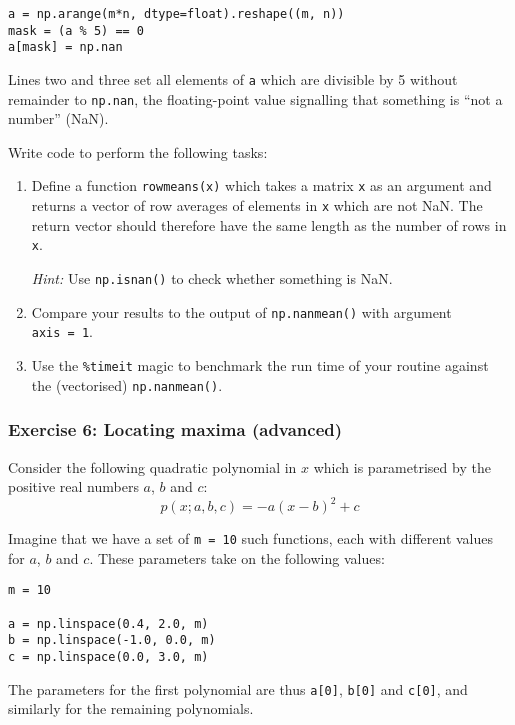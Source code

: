 \documentclass[10pt]{scrartcl}
\begin{document}
\begin{verbatim}
a = np.arange(m*n, dtype=float).reshape((m, n))
mask = (a % 5) == 0
a[mask] = np.nan
\end{verbatim}

Lines two and three set all elements of \texttt{a} which are divisible
by 5 without remainder to \texttt{np.nan}, the floating-point value
signalling that something is ``not a number'' (NaN).

Write code to perform the following tasks:

\begin{enumerate}
\def\labelenumi{\arabic{enumi}.}
\item
  Define a function \texttt{rowmeans(x)} which takes a matrix \texttt{x}
  as an argument and returns a vector of row averages of elements in
  \texttt{x} which are not NaN. The return vector should therefore have
  the same length as the number of rows in \texttt{x}.

  \emph{Hint:} Use \texttt{np.isnan()} to check whether something is
  NaN.
\item
  Compare your results to the output of \texttt{np.nanmean()} with
  argument \texttt{axis\ =\ 1}.
\item
  Use the \texttt{\%timeit} magic to benchmark the run time of your
  routine against the (vectorised) \texttt{np.nanmean()}.
\end{enumerate}

    \hypertarget{exercise-6-locating-maxima-advanced}{%
\subsubsection{Exercise 6: Locating maxima
(advanced)}\label{exercise-6-locating-maxima-advanced}}

Consider the following quadratic polynomial in \(x\) which is
parametrised by the positive real numbers \(a\), \(b\) and \(c\): \[
p(x;a,b,c) = -a (x-b)^2 + c
\]

Imagine that we have a set of \texttt{m\ =\ 10} such functions, each
with different values for \(a\), \(b\) and \(c\). These parameters take
on the following values:

\begin{verbatim}
m = 10

a = np.linspace(0.4, 2.0, m)
b = np.linspace(-1.0, 0.0, m)
c = np.linspace(0.0, 3.0, m)
\end{verbatim}

The parameters for the first polynomial are thus \texttt{a{[}0{]}},
\texttt{b{[}0{]}} and \texttt{c{[}0{]}}, and similarly for the remaining
polynomials.
\end{document}
